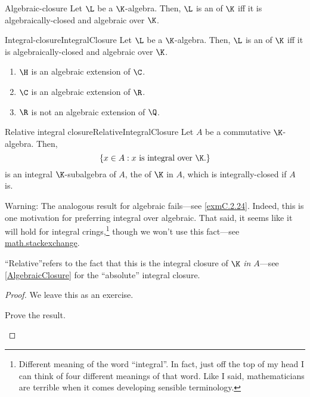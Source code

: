 \begin{dfn}{Algebraic-closure}{}
	Let $\L$ be a $\K$-algebra.  Then, $\L$ is an  of $\K$ iff it is algebraically-closed and algebraic over $\K$.
\end{dfn}
\begin{dfn}{Integral-closure}{IntegralClosure}
	Let $\L$ be a $\K$-algebra.  Then, $\L$ is an  of $\K$ iff it is algebraically-closed and algebraic over $\K$.
\end{dfn}
\begin{exm}{}{}
	\begin{enumerate}
		\item $\H$ is an algebraic extension of $\C$.
		\item $\C$ is an algebraic extension of $\R$.
		\item $\R$ is not an algebraic extension of $\Q$.
	\end{enumerate}
\end{exm}
\begin{prp}{Relative integral closure}{RelativeIntegralClosure}
	Let $A$ be a commutative $\K$-algebra.  Then,
	\begin{equation}
		\left\{ x\in A:x\text{ is integral over }\K \text{.}\right\}
	\end{equation}
	is an integral $\K$-subalgebra of $A$, the  of $\K$ in $A$, which is integrally-closed if $A$ is.
	\begin{rmk}
		Warning:  The analogous result for algebraic fails---see \cref{exmC.2.24}.  Indeed, this is one motivation for preferring integral over algebraic.  That said, it seems like it will hold for integral crings,\footnote{Different meaning of the word ``integral''.  In fact, just off the top of my head I can think of four different meanings of that word.  Like I said, mathematicians are terrible when it comes developing sensible terminology.} though we won't use this fact---see \href{https://math.stackexchange.com/questions/759345/algebraic-vs-integral-closure-of-a-ring?rq=1}{math.stackexchange}.
	\end{rmk}
	\begin{rmk}
		``Relative''refers to the fact that this is the integral closure of $\K$ \emph{in $A$}---see \cref{AlgebraicClosure} for the ``absolute'' integral closure.  
	\end{rmk}
	\begin{proof}
		We leave this as an exercise.
		\begin{exr}[breakable=false]{}{}
			Prove the result.
		\end{exr}
	\end{proof}
\end{prp}

